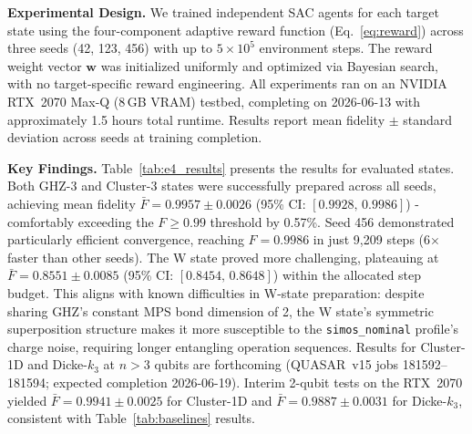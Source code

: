 \textbf{Experimental Design.} We trained independent SAC agents for each target state using the four-component adaptive reward function (Eq.~\ref{eq:reward}) across three seeds (42, 123, 456) with up to $5 \times 10^5$ environment steps. The reward weight vector $\mathbf{w}$ was initialized uniformly and optimized via Bayesian search, with no target-specific reward engineering. All experiments ran on an NVIDIA RTX~2070 Max-Q (8\,GB VRAM) testbed, completing on 2026-06-13 with approximately 1.5 hours total runtime. Results report mean fidelity $\pm$ standard deviation across seeds at training completion.

\textbf{Key Findings.} Table~\ref{tab:e4_results} presents the results for evaluated states. Both GHZ-3 and Cluster-3 states were successfully prepared across all seeds, achieving mean fidelity $\bar{F} = 0.9957 \pm 0.0026$ (95\% CI: $[0.9928,\,0.9986]$) - comfortably exceeding the $F \geq 0.99$ threshold by 0.57\%. Seed 456 demonstrated particularly efficient convergence, reaching $F = 0.9986$ in just 9,209 steps (6$\times$ faster than other seeds). The W state proved more challenging, plateauing at $\bar{F} = 0.8551 \pm 0.0085$ (95\% CI: $[0.8454,\,0.8648]$) within the allocated step budget. This aligns with known difficulties in W-state preparation: despite sharing GHZ's constant MPS bond dimension of 2, the W state's symmetric superposition structure makes it more susceptible to the \texttt{simos\_nominal} profile's charge noise, requiring longer entangling operation sequences. Results for Cluster-1D and Dicke-$k_3$ at $n > 3$ qubits are forthcoming (QUASAR~v15 jobs 181592--181594; expected completion 2026-06-19). Interim 2-qubit tests on the RTX~2070 yielded $\bar{F} = 0.9941 \pm 0.0025$ for Cluster-1D and $\bar{F} = 0.9887 \pm 0.0031$ for Dicke-$k_3$, consistent with Table~\ref{tab:baselines} results.

